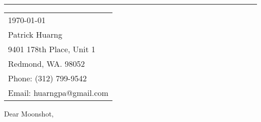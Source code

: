 \documentclass{article}
\begin{document}


\vspace{-1em} %

\rule{\linewidth}{1pt} %

\bigskip\bigskip %


\hfill
\begin{tabular}{l @{}}
	\today \bigskip\\ %
	Patrick Huarng \\
	9401 178th Place, Unit 1 \\ %
	Redmond, WA. 98052 \\
	Phone: (312) 799-9542 \\
	Email: huarngpa@gmail.com
\end{tabular}

\bigskip %



\bigskip %

Dear Moonshot,

\bigskip %

\end{document}
